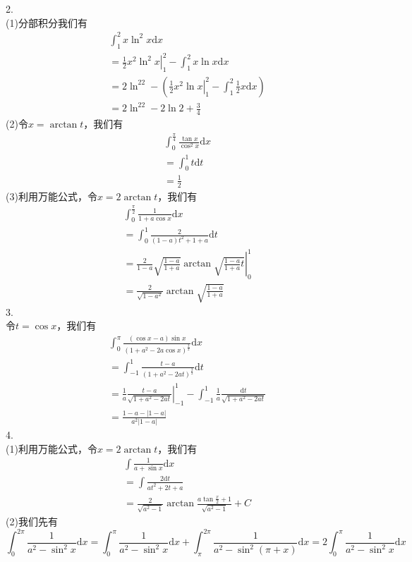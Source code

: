 \documentclass[utf8]{ctexart}
\begin{document}
2.\\
(1)分部积分我们有
\begin{align*}
	&\int_{1}^{2}x\ln^2x\mathrm{d}x\\
	&=\left.\frac{1}{2}x^2\ln^2x\right|_1^2-\int_{1}^{2}x\ln x\mathrm{d}x\\
	&=2\ln^22-(\left.\frac{1}{2}x^2\ln x\right|_1^2-\int_{1}^{2}\frac{1}{2}x\mathrm{d}x)\\
	&=2\ln^22-2\ln 2+\frac{3}{4}
\end{align*}
(2)令$x=\arctan t$，我们有
\begin{align*}
	&\int_{0}^{\frac{\pi}{4}}\frac{\tan x}{\cos^2x}\mathrm{d}x\\
	&=\int_{0}^{1}t\mathrm{d}t\\
	&=\frac{1}{2}
\end{align*}
(3)利用万能公式，令$x=2\arctan t$，我们有
\begin{align*}
	&\int_{0}^{\frac{\pi}{2}}\frac{1}{1+a\cos x}\mathrm{d}x\\
	&=\int_{0}^{1}\frac{2}{(1-a)t^2+1+a}\mathrm{d}t\\
	&=\left.\frac{2}{1-a}\sqrt{\frac{1-a}{1+a}}\arctan\sqrt{\frac{1-a}{1+a}t}\right|_0^1\\
	&=\frac{2}{\sqrt{1-a^2}}\arctan\sqrt{\frac{1-a}{1+a}}
\end{align*}
3.\\
令$t=\cos x$，我们有
\begin{align*}
	&\int_{0}^{\pi}\frac{(\cos x-a)\sin x}{(1+a^2-2a\cos x)^\frac{3}{2}}\mathrm{d}x\\
	&=\int_{-1}^{1}\frac{t-a}{(1+a^2-2at)^\frac{3}{2}}\mathrm{d}t\\
	&=\left.\frac{1}{a}\frac{t-a}{\sqrt{1+a^2-2at}}\right|_{-1}^1-\int_{-1}^{1}\frac{1}{a}\frac{\mathrm{d}t}{\sqrt{1+a^2-2at}}\\
	&=\frac{1-a-|1-a|}{a^2|1-a|}
\end{align*}
4.\\
(1)利用万能公式，令$x=2\arctan t$，我们有
\begin{align*}
	&\int\frac{1}{a+\sin x}\mathrm{d}x\\
	&=\int\frac{2\mathrm{d}t}{at^2+2t+a}\\
	&=\frac{2}{\sqrt{a^2-1}}\arctan\frac{a\tan\frac{x}{2}+1}{\sqrt{a^2-1}}+C
\end{align*}
(2)我们先有
\[\int_{0}^{2\pi}\frac{1}{a^2-\sin^2x}\mathrm{d}x=\int_{0}^{\pi}\frac{1}{a^2-\sin^2x}\mathrm{d}x+\int_{\pi}^{2\pi}\frac{1}{a^2-\sin^2(\pi+x)}\mathrm{d}x=2\int_{0}^{\pi}\frac{1}{a^2-\sin^2x}\mathrm{d}x\]
\end{document}
